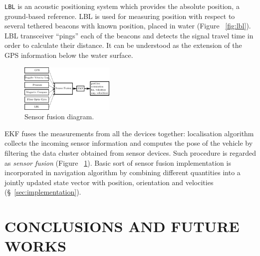 \documentclass[a4paper, 10pt, conference]{ieeeconf}        %
\newcommand{\T}{\texttt}
\begin{document}
\T{LBL} is an acoustic positioning system which provides the absolute position, a ground-based reference. LBL is used for measuring position with respect to several tethered beacons with known position, placed in water (Figure ~\ref{fig:lbl}). LBL transceiver ``pings'' each of the beacons and detects the signal travel time in order to calculate their distance. It can be understood as the extension of the GPS information below the water surface. 
\begin{figure}
  \centering
    \includegraphics[width=0.4\textwidth]{fusion.pdf}
  \caption{Sensor fusion diagram.}
\vspace{-10pt}
\label{fig:sensor-fusion}
\end{figure}
EKF fuses the measurements from all the devices together: localisation algorithm collects the incoming sensor information and computes the pose of the vehicle by filtering the data cluster obtained from sensor devices. Such procedure is regarded as \textit{sensor fusion} (Figure ~\ref{fig:sensor-fusion}). Basic sort of sensor fusion implementation is incorporated in navigation algorithm by combining different quantities into a jointly updated state vector with position, orientation and velocities (\S~\ref{sec:implementation}).


\addtolength{\textheight}{-3cm}   %

\section{CONCLUSIONS AND FUTURE WORKS} \label{sec:concl}
\end{document}
